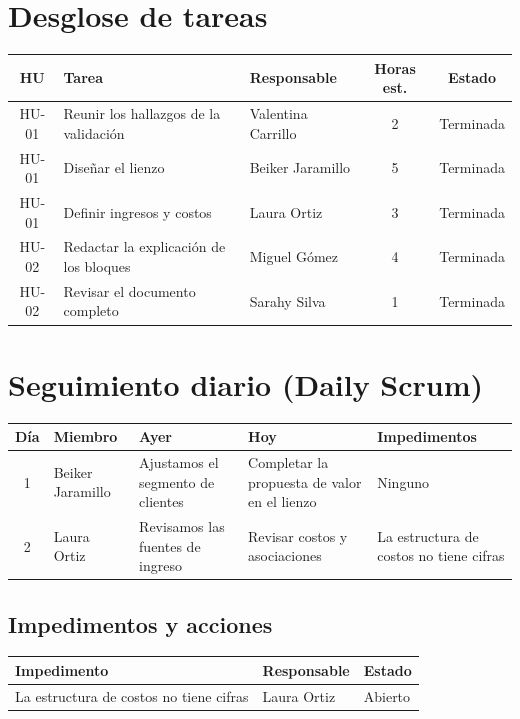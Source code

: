 \documentclass[11pt,a4paper]{article}
\begin{document}
\section{Desglose de tareas}

\begin{tabularx}{\textwidth}{c X l c c}
  \toprule
  \textbf{HU} & \textbf{Tarea} & \textbf{Responsable} & \textbf{Horas est.} & \textbf{Estado} \\
  \midrule
  HU-01 & Reunir los hallazgos de la validación & Valentina Carrillo & 2 & Terminada \\
  HU-01 & Diseñar el lienzo & Beiker Jaramillo & 5 & Terminada \\
  HU-01 & Definir ingresos y costos & Laura Ortiz & 3 & Terminada \\
  HU-02 & Redactar la explicación de los bloques & Miguel Gómez & 4 & Terminada \\
  HU-02 & Revisar el documento completo & Sarahy Silva & 1 & Terminada \\
  \bottomrule
\end{tabularx}

\section{Seguimiento diario (Daily Scrum)}

\begin{tabularx}{\textwidth}{c l X X X}
  \toprule
  \textbf{Día} & \textbf{Miembro} & \textbf{Ayer} & \textbf{Hoy} & \textbf{Impedimentos} \\
  \midrule
  1 & Beiker Jaramillo & Ajustamos el segmento de clientes & Completar la propuesta de valor en el lienzo & Ninguno \\
  2 & Laura Ortiz & Revisamos las fuentes de ingreso & Revisar costos y asociaciones & La estructura de costos no tiene cifras \\
  \bottomrule
\end{tabularx}

\subsection{Impedimentos y acciones}

\begin{tabularx}{\textwidth}{X l l}
  \toprule
  \textbf{Impedimento} & \textbf{Responsable} & \textbf{Estado} \\
  \midrule
  La estructura de costos no tiene cifras & Laura Ortiz & Abierto \\
  \bottomrule
\end{tabularx}
\end{document}
